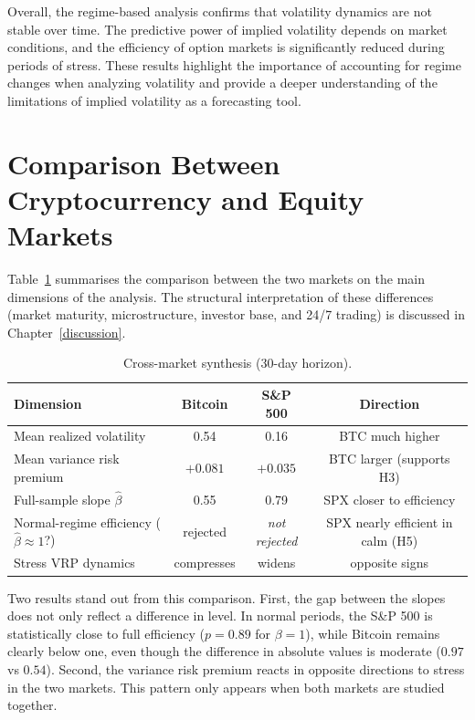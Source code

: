 \documentclass[11pt,a4paper,openany]{report}
\begin{document}
Overall, the regime-based analysis confirms that volatility dynamics are
not stable over time. The predictive power of implied volatility depends
on market conditions, and the efficiency of option markets is
significantly reduced during periods of stress. These results highlight
the importance of accounting for regime changes when analyzing
volatility and provide a deeper understanding of the limitations of
implied volatility as a forecasting tool.

\section{Comparison Between Cryptocurrency and Equity
Markets}\label{comparison-between-cryptocurrency-and-equity-markets}

Table~\ref{tab:summary_xmarket} summarises the comparison between
the two markets on the main dimensions of the analysis. The structural
interpretation of these differences (market maturity, microstructure,
investor base, and 24/7 trading) is discussed in
Chapter~\ref{discussion}.

\begin{table}[H]
\centering
\caption{Cross-market synthesis (30-day horizon).}
\label{tab:summary_xmarket}
\small
\begin{tabular}{lccc}
\toprule
Dimension & Bitcoin & S\&P 500 & Direction \\
\midrule
Mean realized volatility & 0.54 & 0.16 & BTC much higher \\
Mean variance risk premium & $+0.081$ & $+0.035$ & BTC larger (supports H3) \\
Full-sample slope $\hat{\beta}$ & 0.55 & 0.79 & SPX closer to efficiency \\
Normal-regime efficiency ($\hat{\beta}\approx1$?) & rejected & \emph{not rejected} & SPX nearly efficient in calm (H5) \\
Stress VRP dynamics & compresses & widens & opposite signs \\
\bottomrule
\end{tabular}
\end{table}

Two results stand out from this comparison. First, the gap between
the slopes does not only reflect a difference in level. In normal
periods, the S\&P 500 is statistically close to full efficiency
($p=0.89$ for $\beta=1$), while Bitcoin remains clearly below one,
even though the difference in absolute values is moderate ($0.97$ vs
$0.54$). Second, the variance risk premium reacts in opposite
directions to stress in the two markets. This pattern only appears
when both markets are studied together.
\end{document}
